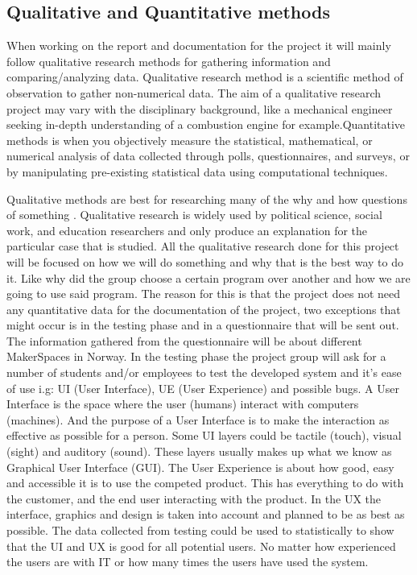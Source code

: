 \subsection{Qualitative and Quantitative methods} When working on the report and documentation for the project it will mainly follow qualitative research methods for gathering information and comparing/analyzing data. Qualitative research method is a scientific method of observation to gather non-numerical data. The aim of a qualitative research project may vary with the disciplinary background, like a mechanical engineer seeking in-depth understanding of a combustion engine for example\cite{Qualitative-Research}.Quantitative methods is when you objectively measure the statistical, mathematical, or numerical analysis of data collected through polls, questionnaires, and surveys, or by manipulating pre-existing statistical data using computational techniques\cite{Quantitative_Methods}.   
 
 Qualitative methods are best for researching many of the why and how questions of something \cite{Qualitative-Research}. Qualitative research is widely used by political science, social work, and education researchers and only produce an explanation for the particular case that is studied. All the qualitative research done for this project will be focused on how we will do something and why that is the best way to do it. Like why did the group choose a certain program over another and how we are going to use said program. The reason for this is that the project does not need any quantitative data for the documentation of the project, two exceptions that might occur is in the testing phase and in a questionnaire that will be sent out. The information gathered from the questionnaire will be about different MakerSpaces in Norway. In the testing phase the project group will ask for a number of students and/or employees to test the developed system and it's ease of use i.g: UI (User Interface), UE (User Experience) and possible bugs. A User Interface is the space where the user (humans) interact with computers (machines)\cite{user-interface}. And the purpose of a User Interface is to make the interaction as effective as possible for a person. Some UI layers could be tactile (touch), visual (sight) and auditory (sound). These layers usually makes up what we know as Graphical User Interface (GUI)\cite{GUI}. The User Experience is about how good, easy and accessible it is to use the competed product. This has everything to do with the customer, and the end user interacting with the product. In the UX the interface, graphics and design is taken into account and planned to be as best as possible\cite{UX}.  
 The data collected from testing could be used to statistically to show that the UI and UX is good for all potential users. No matter how experienced the users are with IT or how many times the users have used the system.

